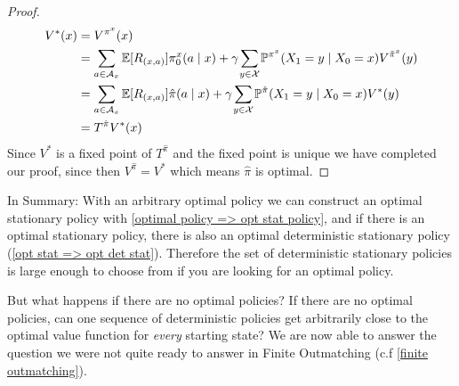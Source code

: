 \begin{proof}
\begin{align*}
		V^*(x)&=V^{\pi^x}(x)\\
		&=\sum_{a\in\cA_x}\E[R_{(x,a)}]\pi_0^x(a\mid x)+\gamma \smashoperator{\sum_{y\in\cX}}\Pr^{\pi^x}(X_1=y\mid X_0=x)
		V^{\tilde{\pi}^x}(y)\\
		&=\sum_{a\in\cA_x}\E[R_{(x,a)}]\hat{\pi}(a\mid x)+\gamma \smashoperator{\sum_{y\in\cX}}\Pr^{\hat{\pi}}(X_1=y\mid X_0=x) V^*(y)\\
		&=T^{\hat{\pi}} V^* (x)
	\end{align*}
	Since \(V^*\) is a fixed point of \(T^{\hat{\pi}}\) and the fixed point is unique we have completed our proof, since then \(V^{\hat{\pi}}=V^*\) which means \(\hat{\pi}\) is optimal. 
\end{proof}

In Summary: With an arbitrary optimal policy we can construct an optimal stationary policy with \ref{optimal policy => opt stat policy}, and if there is an optimal stationary policy, there is also an optimal deterministic stationary policy (\ref{opt stat => opt det stat}). Therefore the set of deterministic stationary policies is large enough to choose from if you are looking for an optimal policy. 

But what happens if there are no optimal policies? If there are no optimal policies, can one sequence of deterministic policies get arbitrarily close to the optimal value function for \emph{every} starting state? We are now able to answer the question we were not quite ready to answer in Finite Outmatching   (c.f \ref{finite outmatching}).

